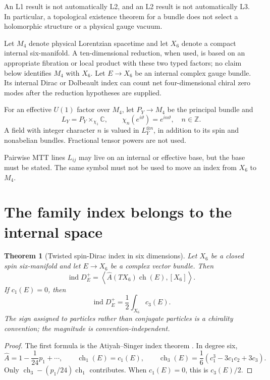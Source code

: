 \documentclass[11pt]{article}
\theoremstyle{plain}
\newtheorem{theorem}{Theorem}[section]
\theoremstyle{definition}
\theoremstyle{remark}
\newcommand{\Z}{\mathbb{Z}}
\newcommand{\C}{\mathbb{C}}
\newcommand{\ind}{\operatorname{ind}}
\begin{document}
An L1 result is not automatically L2, and an L2 result is not automatically
L3. In particular, a topological existence theorem for a bundle does not select
a holomorphic structure or a physical gauge vacuum.

Let $M_4$ denote physical Lorentzian spacetime and let $X_6$ denote a compact
internal six-manifold. A ten-dimensional reduction, when used, is based on an
appropriate fibration or local product with these two typed factors; no claim
below identifies $M_4$ with $X_6$. Let $E\to X_6$ be an internal complex gauge
bundle. Its internal Dirac or Dolbeault index can count net four-dimensional
chiral zero modes after the reduction hypotheses are supplied.

For an effective $U(1)$ factor over $M_4$, let $P_Y\to M_4$ be the principal
bundle and
\[
 L_Y=P_Y\times_{\chi_1}\C,
 \qquad \chi_n(e^{i\vartheta})=e^{in\vartheta},\quad n\in\Z.
\]
A field with integer character $n$ is valued in $L_Y^{\otimes n}$, in addition
to its spin and nonabelian bundles. Fractional tensor powers are not used.

Pairwise MTT lines $L_{ij}$ may live on an internal or effective base, but the
base must be stated. The same symbol must not be used to move an index from
$X_6$ to $M_4$.

\section{The family index belongs to the internal space}

\begin{theorem}[Twisted spin-Dirac index in six dimensions]
\label{thm:internal-index}
Let $X_6$ be a closed spin six-manifold and let $E\to X_6$ be a complex vector
bundle. Then
\[
 \ind D_E^+
 =\left\langle \widehat A(TX_6)\operatorname{ch}(E),[X_6]\right\rangle.
\]
If $c_1(E)=0$, then
\begin{equation}
 \ind D_E^+=\frac12\int_{X_6}c_3(E).
 \label{eq:su-index}
\end{equation}
The sign assigned to particles rather than conjugate particles is a chirality
convention; the magnitude is convention-independent.
\end{theorem}

\begin{proof}
The first formula is the Atiyah--Singer index theorem
\cite{AtiyahSinger1968}. In degree six,
\[
 \widehat A=1-\frac1{24}p_1+\cdots,
 \qquad
 \operatorname{ch}_1(E)=c_1(E),
 \qquad
 \operatorname{ch}_3(E)=\frac16
 (c_1^3-3c_1c_2+3c_3).
\]
Only $\operatorname{ch}_3-(p_1/24)\operatorname{ch}_1$ contributes. When
$c_1(E)=0$, this is $c_3(E)/2$.
\end{proof}
\end{document}
